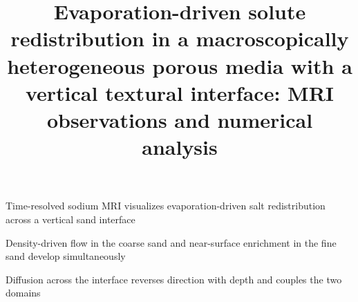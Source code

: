 \documentclass[final]{agujournal2019}
\begin{document}
\title{Evaporation-driven solute redistribution in a macroscopically
heterogeneous porous media with a vertical textural interface:
MRI observations and numerical analysis}




\begin{keypoints}
\raggedright
\item %
      Time-resolved sodium MRI visualizes evaporation-driven salt redistribution across a vertical sand interface
\item %
      Density-driven flow in the coarse sand and near-surface enrichment in the fine sand develop simultaneously
\item %
      Diffusion across the interface reverses direction with depth and couples the two domains
\end{keypoints}
\end{document}
